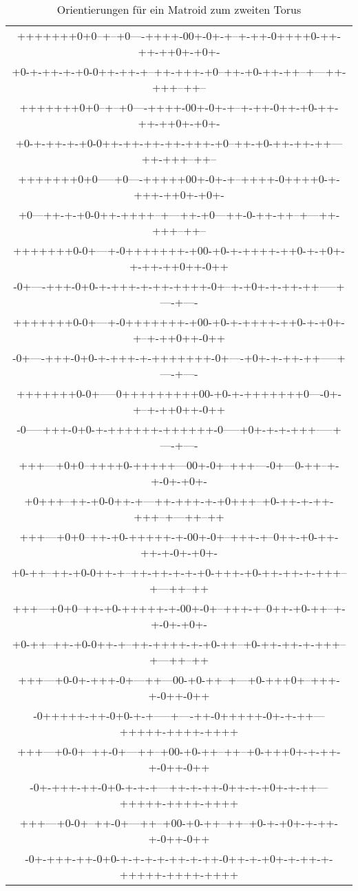 \begin{table}%
\begin{center}
{\scriptsize\tt\begin{tabular}{c}
+++++++0+0--+--+0----++++-00+-0+-+--+-++-0++++0-++-++-++0+-+0+-\\
+0-+-++-+-+0-0++-++-+--++-+++-+0--++-+0-++-++--+---++-+++--++--\\[1mm]
+++++++0+0--+--+0----++++-00+-0+-+--+-++-0++-+0-++-++-++0+-+0+-\\
+0-+-++-+-+0-0++-++-++-++-+++-+0--++-+0-++-++-++---++-+++--++--\\[1mm]
+++++++0+0-----+0----+++++00+-0+-+--++++-0++++0-+-+++-++0+-+0+-\\
+0---++-+-+0-0++-++++--+---++-+0---++-0-++-++--+---++-+++--++--\\[1mm]
+++++++0-0+---+-0+++++++-+00-+0-+-++++-++0-+-+0+-+-++-++0++-0++\\
-0+----+++-0+0-+-+++-+-++-++++-0+--+-+0+-+-++-++-----+----+----\\[1mm]
+++++++0-0+---+-0+++++++-+00-+0-+-++++-++0-+-+0+-+--+-++0++-0++\\
-0+----+++-0+0-+-+++-+-+++++++-0+----+0+-+-++-++-----+----+----\\[1mm]
+++++++0-0+-----0+++++++++00-+0-+-+++++++0----0+-+--+-++0++-0++\\
-0-----+++-0+0-+-++++++-++++++-0-----+0+-+-+-+++-----+----+----\\[1mm]
+++---+0+0--++++0-+++++---00+-0+--+++----0+---0-++--+-+-0+-+0+-\\
+0+++--++-+0-0++-+---++-+++-+-+0+++--+0-++-+-++-+++--+---++--++\\[1mm]
+++---+0+0--++-+0-+++++-+-00+-0+--+++-+--0++-+0-++-++-+-0+-+0+-\\
+0-++--++-+0-0++-+--++-++-+-+-+0-+++-+0-++-++-+-+++--+---++--++\\[1mm]
+++---+0+0--++-+0-+++++-+-00+-0+--+++-+--0++-+0-++--+-+-0+-+0+-\\
+0-++--++-+0-0++-+--++-++++-+-+0-++--+0-++-++-+-+++--+---++--++\\[1mm]
+++---+0-0+-+++-0+---++---00-+0-++--+---+0-+++0+--+++-+-0++-0++\\
-0+++++-++-0+0-+-+-----+----++-0+++++-0+-+-++---+++++-++++-++++\\[1mm]
+++---+0-0+--++-0+---++--+00-+0-++--++--+0-+++0+-+-++-+-0++-0++\\
-0+-+++-++-0+0-+-+-+---++-+-++-0++-+-+0+-+-++---+++++-++++-++++\\[1mm]
+++---+0-0+--++-0+---++--+00-+0-++--++--+0-+-+0+-+-++-+-0++-0++\\
-0+-+++-++-0+0-+-+-+-+-++-+-++-0++-+-+0+-+-++-+-+++++-++++-++++
\end{tabular}}
\end{center}
\caption{\label{orimattor}Orientierungen für ein Matroid zum zweiten Torus}
\end{table}

